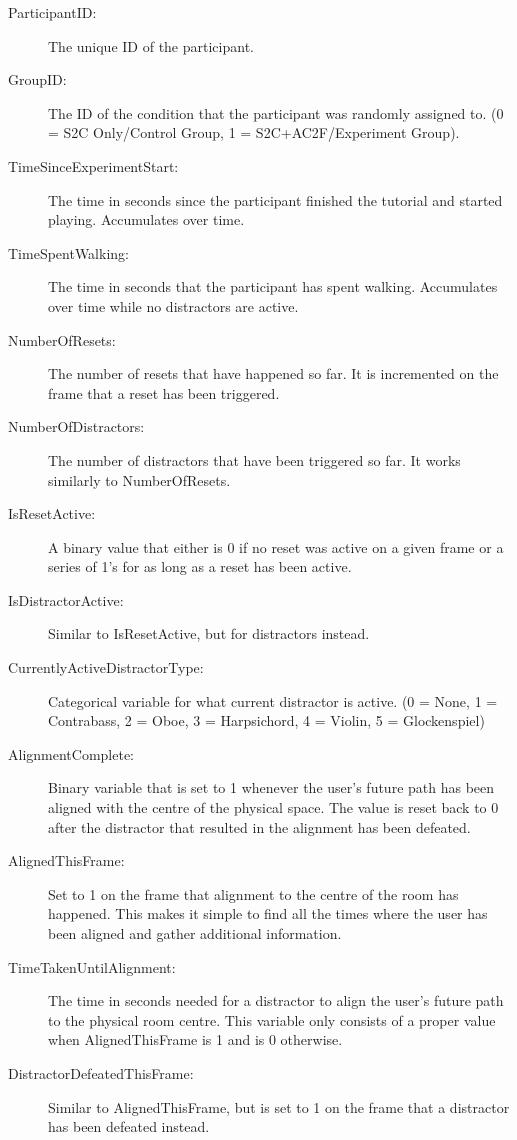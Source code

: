 \begin{description}
   \item[ParticipantID:] The unique ID of the participant.
   \item[GroupID:] The ID of the condition that the participant was randomly assigned to. (0 = S2C Only/Control Group, 1 = S2C+AC2F/Experiment Group).
   \item[TimeSinceExperimentStart:] The time in seconds since the participant finished the tutorial and started playing. Accumulates over time. 
   \item[TimeSpentWalking:] The time in seconds that the participant has spent walking. Accumulates over time while no distractors are active. 
   \item[NumberOfResets:] The number of resets that have happened so far. It is incremented on the frame that a reset has been triggered. 
   \item[NumberOfDistractors:] The number of distractors that have been triggered so far. It works similarly to NumberOfResets.
   \item[IsResetActive:] A binary value that either is 0 if no reset was active on a given frame or a series of 1's for as long as a reset has been active. 
   \item[IsDistractorActive:] Similar to IsResetActive, but for distractors instead.
   \item[CurrentlyActiveDistractorType:] Categorical variable for what current distractor is active. (0 = None, 1 = Contrabass, 2 = Oboe, 3 = Harpsichord, 4 = Violin, 5 = Glockenspiel)
   \item[AlignmentComplete:] Binary variable that is set to 1 whenever the user's future path has been aligned with the centre of the physical space. The value is reset back to 0 after the distractor that resulted in the alignment has been defeated. 
   \item[AlignedThisFrame:] Set to 1 on the frame that alignment to the centre of the room has happened. This makes it simple to find all the times where the user has been aligned and gather additional information.
   \item[TimeTakenUntilAlignment:] The time in seconds needed for a distractor to align the user's future path to the physical room centre. This variable only consists of a proper value when AlignedThisFrame is 1 and is 0 otherwise. 
   \item[DistractorDefeatedThisFrame:] Similar to AlignedThisFrame, but is set to 1 on the frame that a distractor has been defeated instead. 

\end{description}
